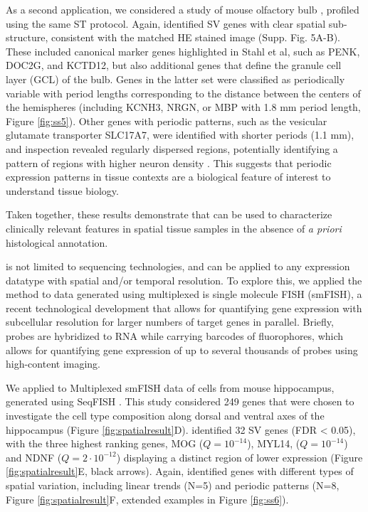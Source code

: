 As a second application, we considered a study of mouse olfactory bulb \cite{Stahl2016-ym}, profiled using the same ST protocol. Again,  identified SV genes with clear spatial sub-structure, consistent with the matched HE stained image (Supp. Fig. 5A-B). These included canonical marker genes highlighted in Stahl et al, such as PENK, DOC2G, and KCTD12, but also additional genes that define the granule cell layer (GCL) of the bulb. Genes in the latter set were classified as periodically variable with period lengths corresponding to the distance between the centers of the hemispheres (including KCNH3, NRGN, or MBP with 1.8 mm period length, Figure \ref{fig:ss5}). Other genes with periodic patterns, such as the vesicular glutamate transporter SLC17A7, were identified with shorter periods (1.1 mm), and inspection revealed regularly dispersed regions, potentially identifying a pattern of regions with higher neuron density \cite{Jahn2000-yw}. This suggests that periodic expression patterns in tissue contexts are a biological feature of interest to understand tissue biology. 

Taken together, these results demonstrate that  can be used to characterize clinically relevant features in spatial tissue samples in the absence of \textit{a priori} histological annotation.

 is not limited to sequencing technologies, and can be applied to any expression datatype with spatial and/or temporal resolution. To explore this, we applied the method to data generated using multiplexed is single molecule FISH (smFISH), a recent technological development that allows for quantifying gene expression with subcellular resolution for larger numbers of target genes in parallel. Briefly, probes are hybridized to RNA while carrying barcodes of fluorophores, which allows for quantifying gene expression of up to several thousands of probes \cite{Chen2015-rm} using high-content imaging.

We applied  to Multiplexed smFISH data of cells from mouse hippocampus, generated using SeqFISH \cite{Shah2016-bi}. This study considered 249 genes that were chosen to investigate the cell type composition along dorsal and ventral axes of the hippocampus (Figure \ref{fig:spatialresult}D).  identified 32 SV genes (FDR < 0.05), with the three highest ranking genes, MOG (\( Q = 10^{-14} \)), MYL14, (\( Q = 10^{-14} \)) and NDNF (\( Q = 2 \cdot 10^{-12} \)) displaying a distinct region of lower expression (Figure \ref{fig:spatialresult}E, black arrows). Again,  identified genes with different types of spatial variation, including linear trends (N=5) and periodic patterns (N=8, Figure \ref{fig:spatialresult}F, extended examples in Figure \ref{fig:ss6}).

